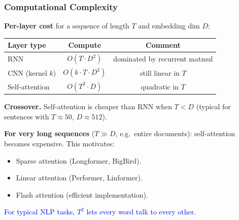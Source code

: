 \documentclass[notes,11pt, aspectratio=169]{beamer}
\begin{document}
\begin{frame}
\frametitle{Computational Complexity}

\textbf{Per-layer cost} for a sequence of length $T$ and embedding dim $D$:

\vspace{4pt}
\begin{center}
\renewcommand{\arraystretch}{1.15}
\scriptsize
\begin{tabular}{l c c}
\toprule
\textbf{Layer type} & \textbf{Compute} & \textbf{Comment} \\
\midrule
RNN & $O(T \cdot D^2)$ & dominated by recurrent matmul \\
CNN (kernel $k$) & $O(k \cdot T \cdot D^2)$ & still linear in $T$ \\
Self-attention & $O(T^2 \cdot D)$ & quadratic in $T$ \\
\bottomrule
\end{tabular}
\end{center}

\vspace{5pt}
\textbf{Crossover.} Self-attention is cheaper than RNN when $T < D$ (typical for sentences with $T \approx 50$, $D \approx 512$).

\vspace{5pt}
\textbf{For very long sequences} ($T \gg D$, e.g.\ entire documents): self-attention becomes expensive. This motivates:
\begin{itemize}
    \item Sparse attention (Longformer, BigBird).
    \item Linear attention (Performer, Linformer).
    \item Flash attention (efficient implementation).
\end{itemize}

\textcolor{blue}{For typical NLP tasks, $T^2$ lets every word talk to every other.}
\end{frame}
\end{document}

